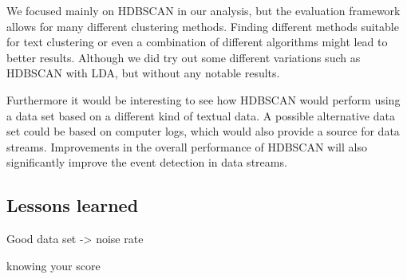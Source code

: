 We focused mainly on HDBSCAN in our analysis, but the evaluation framework allows for many different clustering methods. Finding different methods suitable for text clustering or even a combination of different algorithms might lead to better results. Although we did try out some different variations such as HDBSCAN with LDA, but without any notable results. 

Furthermore it would be interesting to see how HDBSCAN would perform using a data set based on a different kind of textual data. A possible alternative data set could be based on computer logs, which would also provide a source for data streams. Improvements in the overall performance of HDBSCAN will also significantly improve the event detection in data streams.

\subsection{Lessons learned}
Good data set -> noise rate


knowing your score


